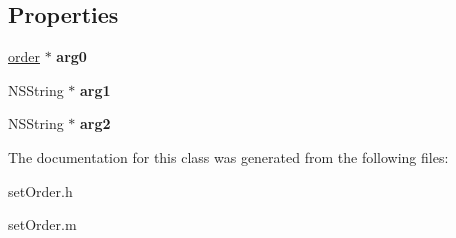 \subsection*{Properties}
\begin{DoxyCompactItemize}
\item 
\hypertarget{interfaceset_order_a753b286035e50acb7fb91726e381e0e8}{}\hyperlink{interfaceorder}{order} $\ast$ {\bfseries arg0}\label{interfaceset_order_a753b286035e50acb7fb91726e381e0e8}

\item 
\hypertarget{interfaceset_order_ad90fe4147d36c463f9bf2396798fa836}{}N\+S\+String $\ast$ {\bfseries arg1}\label{interfaceset_order_ad90fe4147d36c463f9bf2396798fa836}

\item 
\hypertarget{interfaceset_order_a4e89fed4a0e5da39c18681688ab3ec92}{}N\+S\+String $\ast$ {\bfseries arg2}\label{interfaceset_order_a4e89fed4a0e5da39c18681688ab3ec92}

\end{DoxyCompactItemize}


The documentation for this class was generated from the following files\+:\begin{DoxyCompactItemize}
\item 
set\+Order.\+h\item 
set\+Order.\+m\end{DoxyCompactItemize}
